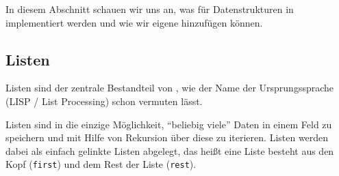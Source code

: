 
In diesem Abschnitt schauen wir uns an, was für Datenstrukturen in \racketText implementiert werden und wie wir eigene hinzufügen können.

\subsection{Listen}
	\label{sec:racket_lists}

	Listen sind der zentrale Bestandteil von \racketText, wie der Name der Ursprungssprache (LISP / List Processing) schon vermuten lässt.
	
	Listen sind in \racketText die einzige Möglichkeit, \enquote{beliebig viele} Daten in einem Feld zu speichern und mit Hilfe von Rekursion über diese zu iterieren. Listen werden dabei als einfach gelinkte Listen abgelegt, das heißt eine Liste besteht aus den Kopf (\texttt{first}) und dem Rest der Liste (\texttt{rest}).
	
